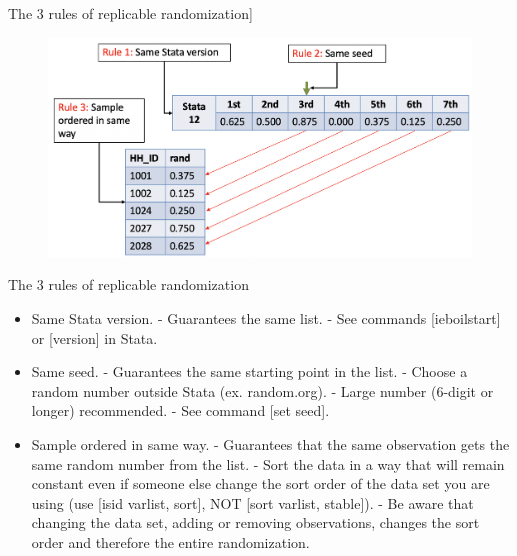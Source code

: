 \documentclass[aspectratio=169]{beamer}
\begin{document}
\begin{frame}{The 3 rules of replicable randomization]}

\begin{figure}
	\centering
	\includegraphics[width=\linewidth]{img/Randomization8}
\end{figure}

\end{frame}


\begin{frame}{The 3 rules of replicable randomization}
\begin{multicols}{2}	

\begin{itemize}[<default overlay specification>]
	\item<1>  Same Stata version.
		\newline - Guarantees the same list.
		\newline - See commands [ieboilstart] or [version] in Stata.
	\item<1>  Same seed.
		\newline - Guarantees the same starting point in the list.
		\newline - Choose a random number outside Stata (ex. random.org).
		\newline - Large number (6-digit or longer) recommended.
		\newline - See command [set seed].
	\item<1>  Sample ordered in same way.
		\newline - Guarantees that the same observation gets the same random number from the list.
		\newline - Sort the data in a way that will remain constant even if someone else change the sort order of the data set you are using (use [isid varlist, sort], NOT [sort varlist, stable]).
		\newline - Be aware that changing the data set, adding or removing observations, changes the sort order and therefore the entire randomization.
\end{itemize}

\end{multicols}
\end{frame}
\end{document}

